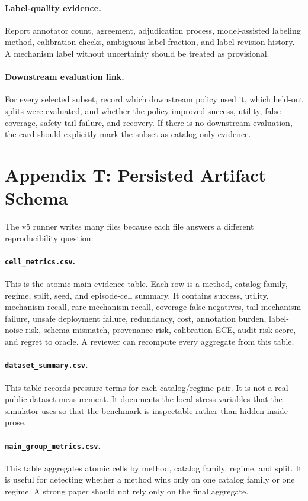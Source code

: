 \documentclass{article}
\begin{document}
\paragraph{Label-quality evidence.}
Report annotator count, agreement, adjudication process, model-assisted labeling method, calibration checks, ambiguous-label fraction, and label revision history. A mechanism label without uncertainty should be treated as provisional.

\paragraph{Downstream evaluation link.}
For every selected subset, record which downstream policy used it, which held-out splits were evaluated, and whether the policy improved success, utility, false coverage, safety-tail failure, and recovery. If there is no downstream evaluation, the card should explicitly mark the subset as catalog-only evidence.

\section{Appendix T: Persisted Artifact Schema}
The v5 runner writes many files because each file answers a different reproducibility question.

\paragraph{\texttt{cell\_metrics.csv}.}
This is the atomic main evidence table. Each row is a method, catalog family, regime, split, seed, and episode-cell summary. It contains success, utility, mechanism recall, rare-mechanism recall, coverage false negatives, tail mechanism failure, unsafe deployment failure, redundancy, cost, annotation burden, label-noise risk, schema mismatch, provenance risk, calibration ECE, audit risk score, and regret to oracle. A reviewer can recompute every aggregate from this table.

\paragraph{\texttt{dataset\_summary.csv}.}
This table records pressure terms for each catalog/regime pair. It is not a real public-dataset measurement. It documents the local stress variables that the simulator uses so that the benchmark is inspectable rather than hidden inside prose.

\paragraph{\texttt{main\_group\_metrics.csv}.}
This table aggregates atomic cells by method, catalog family, regime, and split. It is useful for detecting whether a method wins only on one catalog family or one regime. A strong paper should not rely only on the final aggregate.
\end{document}
